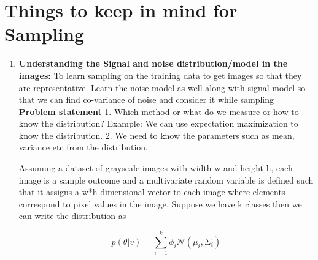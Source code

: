 \documentclass{article}
\begin{document}
\section{Things to keep in mind for Sampling}
\begin{enumerate}
    \item \textbf{Understanding the Signal and noise distribution/model in the images:} To learn sampling on the training data to get images so that they are representative. Learn the noise model as well along with signal model so that we can find co-variance of noise and consider it while sampling \\
    
    \textbf{Problem statement} 1. Which method or what do we measure or how to know the distribution? Example: We can use expectation maximization to know the distribution. 
    2. We need to know the parameters such as mean, variance etc from the distribution. 
    
    Assuming a dataset of grayscale images with width w and height h, each image is a sample outcome and a multivariate random variable is defined such that it assigns a w*h dimensional vector to each image where elements correspond to pixel values in the image. Suppose we have k classes then we can write the distribution as
    
    \begin{equation}
        p(\theta|v) = \sum^{k}_{i=1} \phi_{i}\mathcal{N}(\mu_{i},\Sigma_{i})
    \end{equation}
                                                                                                                                                                                                                                                                                                                                                                                                                                                                                                                                                                                                                                                                                                                                                                                                                                                                                                                                                                                                                                                                                                                                                                                                                                                                       

\end{enumerate}
\end{document}
